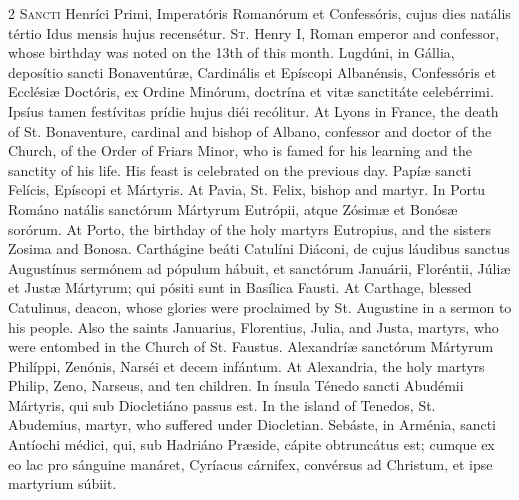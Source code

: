 \begin{paracol}{2}
\lettrine[lines=2]{S}{ancti} Henríci Primi, 
 Imperatóris Romanórum et Confessóris, cujus dies natális tértio Idus mensis 
 hujus recensétur.
\switchcolumn
{}
\lettrine[lines=2]{S}{t.} Henry I, Roman emperor and 
 confessor, whose birthday was noted on the 13th of this month.
\switchcolumn*
{}
Lugdúni, in Gállia, 
 deposítio sancti Bonaventúræ, Cardinális et Epíscopi Albanénsis, Confessóris 
 et Ecclésiæ Doctóris, ex Ordine Minórum, doctrína et vitæ sanctitáte 
 celebérrimi. Ipsíus tamen festívitas prídie hujus diéi recólitur.
\switchcolumn
{}
At Lyons in France, the death of St. 
 Bonaventure, cardinal and bishop of Albano, confessor and doctor of the 
 Church, of the Order of Friars Minor, who is famed for his learning and the 
 sanctity of his life. His feast is celebrated on the previous day.
\switchcolumn*
{}
Papíæ sancti Felícis, 
 Epíscopi et Mártyris.
\switchcolumn
{}
At Pavia, St. Felix, bishop and 
 martyr.
\switchcolumn*
{}
In Portu Románo natális 
 sanctórum Mártyrum Eutrópii, atque Zósimæ et Bonósæ sorórum.
\switchcolumn
{}
At Porto, the birthday of the holy 
 martyrs Eutropius, and the sisters Zosima and Bonosa.
\switchcolumn*
{}
Carthágine beáti 
 Catulíni Diáconi, de cujus láudibus sanctus Augustínus sermónem ad pópulum 
 hábuit, et sanctórum Januárii, Floréntii, Júliæ et Justæ Mártyrum; qui 
 pósiti sunt in Basílica Fausti.
\switchcolumn
{}
At Carthage, blessed Catulinus, 
 deacon, whose glories were proclaimed by St. Augustine in a sermon to his 
 people. Also the saints Januarius, Florentius, Julia, and Justa, 
 martyrs, who were entombed in the Church of St. Faustus.
\switchcolumn*
{}
Alexandríæ sanctórum 
 Mártyrum Philíppi, Zenónis, Narséi et decem infántum.
\switchcolumn
{}
At Alexandria, the holy martyrs 
 Philip, Zeno, Narseus, and ten children.
\switchcolumn*
{}
In ínsula Ténedo sancti 
 Abudémii Mártyris, qui sub Diocletiáno passus est.
\switchcolumn
{}
In the island of Tenedos, St. 
 Abudemius, martyr, who suffered under Diocletian.
\switchcolumn*
{}
Sebáste, in Arménia, sancti Antíochi médici, qui, sub Hadriáno Præside, cápite obtruncátus est; cumque ex eo lac pro sánguine manáret, Cyríacus cárnifex, convérsus ad 
 Christum, et ipse martyrium súbiit.
\switchcolumn

\end{paracol}
